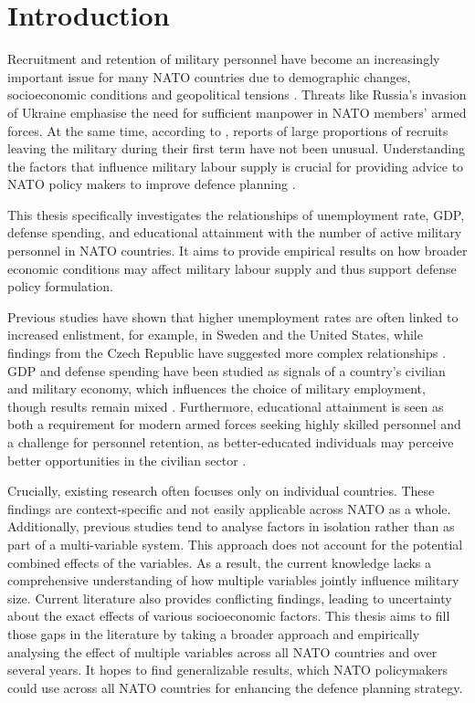 \chapter{Introduction}

Recruitment and retention of military personnel have become an increasingly important issue for many NATO countries due to demographic changes, socioeconomic conditions and geopolitical tensions \parencite{nato_research_and_technology_organization_recruiting_2007,nato_nato_2022}.
Threats like Russia's invasion of Ukraine emphasise the need for sufficient manpower in NATO members' armed forces. 
At the same time, according to \textcite{nato_research_and_technology_organization_recruiting_2007}, reports of large proportions of recruits leaving the military during their first term have not been unusual.
Understanding the factors that influence military labour supply is crucial for providing advice to NATO policy makers to improve defence planning \parencite{nato_research_and_technology_organization_recruiting_2007}.

This thesis specifically investigates the relationships of unemployment rate, GDP, defense spending, and educational attainment with the number of active military personnel in NATO countries.
It aims to provide empirical results on how broader economic conditions may affect military labour supply and thus support defense policy formulation.

Previous studies have shown that higher unemployment rates are often linked to increased enlistment, for example, in Sweden and the United States, while findings from the Czech Republic have suggested more complex relationships \parencite{backstrom_are_2019,asch_cash_2010,holcner_military_2021}. 
GDP and defense spending have been studied as signals of a country's civilian and military economy, which influences the choice of military employment, though results remain mixed \parencite{warner_chapter_1995,holcner_military_2021}. 
Furthermore, educational attainment is seen as both a requirement for modern armed forces seeking highly skilled personnel and a challenge for personnel retention, as better-educated individuals may perceive better opportunities in the civilian sector \parencite{cnas_resources_and_force_readiness_division_fiscal_nodate,hof_quality_2023}.

Crucially, existing research often focuses only on individual countries. 
These findings are context-specific and not easily applicable across NATO as a whole. 
Additionally, previous studies tend to analyse factors in isolation rather than as part of a multi-variable system. 
This approach does not account for the potential combined effects of the variables. 
As a result, the current knowledge lacks a comprehensive understanding of how multiple variables jointly influence military size. 
Current literature also provides conflicting findings, leading to uncertainty about the exact effects of various socioeconomic factors. 
This thesis aims to fill those gaps in the literature by taking a broader approach and empirically analysing the effect of multiple variables across all NATO countries and over several years.
It hopes to find generalizable results, which NATO policymakers could use across all NATO countries for enhancing the defence planning strategy.

